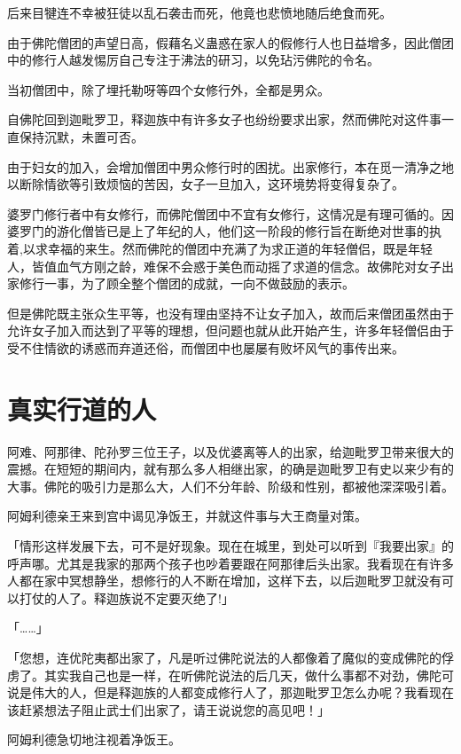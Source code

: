 \documentclass[twoside,openany]{book}
\begin{document}
后来目犍连不幸被狂徒以乱石袭击而死，他竟也悲愤地随后绝食而死。

由于佛陀僧团的声望日高，假藉名义蛊惑在家人的假修行人也日益增多，因此僧团中的修行人越发惕厉自己专注于沸法的研习，以免玷污佛陀的令名。

当初僧团中，除了埋托勒呀等四个女修行外，全都是男众。

自佛陀回到迦毗罗卫，释迦族中有许多女子也纷纷要求出家，然而佛陀对这件事一直保持沉默，未置可否。

由于妇女的加入，会增加僧团中男众修行时的困扰。出家修行，本在觅一清净之地以断除情欲等引致烦恼的苦因，女子一旦加入，这环境势将变得复杂了。

婆罗门修行者中有女修行，而佛陀僧团中不宜有女修行，这情况是有理可循的。因婆罗门的游化僧皆已是上了年纪的人，他们这一阶段的修行旨在断绝对世事的执着,以求幸福的来生。然而佛陀的僧团中充满了为求正道的年轻僧侣，既是年轻人，皆值血气方刚之龄，难保不会惑于美色而动摇了求道的信念。故佛陀对女子出家修行一事，为了顾全整个僧团的成就，一向不做鼓励的表示。

但是佛陀既主张众生平等，也没有理由坚持不让女子加入，故而后来僧团虽然由于允许女子加入而达到了平等的理想，但问题也就从此开始产生，许多年轻僧侣由于受不住情欲的诱惑而弃道还俗，而僧团中也屡屡有败坏风气的事传出来。

\section{真实行道的人}\label{sec9.5}

阿难、阿那律、陀孙罗三位王子，以及优婆离等人的出家，给迦毗罗卫带来很大的震撼。在短短的期间内，就有那么多人相继出家，的确是迦毗罗卫有史以来少有的大事。佛陀的吸引力是那么大，人们不分年龄、阶级和性别，都被他深深吸引着。

阿姆利德亲王来到宫中谒见净饭王，并就这件事与大王商量对策。

「情形这样发展下去，可不是好现象。现在在城里，到处可以听到『我要出家』的呼声哪。尤其是我家的那两个孩子也吵着要跟在阿那律后头出家。我看现在有许多人都在家中冥想静坐，想修行的人不断在增加，这样下去，以后迦毗罗卫就没有可以打仗的人了。释迦族说不定要灭绝了!」

「……」

「您想，连优陀夷都出家了，凡是听过佛陀说法的人都像着了魔似的变成佛陀的俘虏了。其实我自己也是一样，在听佛陀说法的后几天，做什么事都不对劲，佛陀可说是伟大的人，但是释迦族的人都变成修行人了，那迦毗罗卫怎么办呢？我看现在该赶紧想法子阻止武士们出家了，请王说说您的高见吧！」

阿姆利德急切地注视着净饭王。
\end{document}
